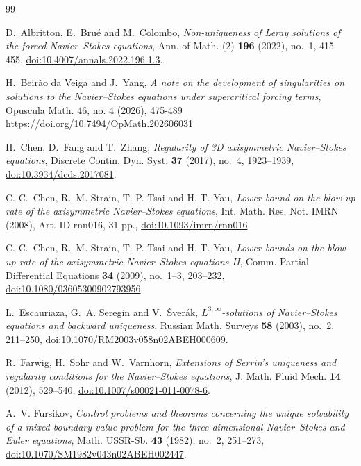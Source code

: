 \documentclass[10pt]{amsart}
\theoremstyle{definition}
\begin{document}
\begin{thebibliography}{99}

D.~Albritton, E.~Bru\'e and M.~Colombo,
\emph{Non-uniqueness of Leray solutions of the forced Navier--Stokes equations},
Ann. of Math. (2) \textbf{196} (2022), no.~1, 415--455,
\href{https://doi.org/10.4007/annals.2022.196.1.3}{doi:10.4007/annals.2022.196.1.3}.

H.~Beir\~ao da Veiga and J.~Yang,
\emph{A note on the development of singularities on solutions to the
Navier--Stokes equations under supercritical forcing terms},
Opuscula Math. 46, no. 4 (2026), 475-489
https://doi.org/10.7494/OpMath.202606031

H.~Chen, D.~Fang and T.~Zhang,
\emph{Regularity of 3D axisymmetric Navier--Stokes equations},
Discrete Contin. Dyn. Syst. \textbf{37} (2017), no.~4, 1923--1939,
\href{https://doi.org/10.3934/dcds.2017081}{doi:10.3934/dcds.2017081}.

C.-C.~Chen, R.~M. Strain, T.-P. Tsai and H.-T. Yau,
\emph{Lower bound on the blow-up rate of the axisymmetric Navier--Stokes
equations},
Int. Math. Res. Not. IMRN (2008), Art. ID rnn016, 31 pp.,
\href{https://doi.org/10.1093/imrn/rnn016}{doi:10.1093/imrn/rnn016}.

C.-C.~Chen, R.~M. Strain, T.-P. Tsai and H.-T. Yau,
\emph{Lower bounds on the blow-up rate of the axisymmetric Navier--Stokes
equations II},
Comm. Partial Differential Equations \textbf{34} (2009), no.~1--3, 203--232,
\href{https://doi.org/10.1080/03605300902793956}{doi:10.1080/03605300902793956}.

L.~Escauriaza, G.~A. Seregin and V.~\v{S}ver\'ak,
\emph{$L^{3,\infty}$-solutions of Navier--Stokes equations and backward
uniqueness},
Russian Math. Surveys \textbf{58} (2003), no.~2, 211--250,
\href{https://doi.org/10.1070/RM2003v058n02ABEH000609}{doi:10.1070/RM2003v058n02ABEH000609}.

R.~Farwig, H.~Sohr and W.~Varnhorn,
\emph{Extensions of Serrin's uniqueness and regularity conditions for the
Navier--Stokes equations},
J. Math. Fluid Mech. \textbf{14} (2012), 529--540,
\href{https://doi.org/10.1007/s00021-011-0078-6}{doi:10.1007/s00021-011-0078-6}.

A.~V. Fursikov,
\emph{Control problems and theorems concerning the unique solvability of a mixed
boundary value problem for the three-dimensional Navier--Stokes and Euler
equations},
Math. USSR-Sb. \textbf{43} (1982), no.~2, 251--273,
\href{https://doi.org/10.1070/SM1982v043n02ABEH002447}{doi:10.1070/SM1982v043n02ABEH002447}.


\end{thebibliography}
\end{document}
